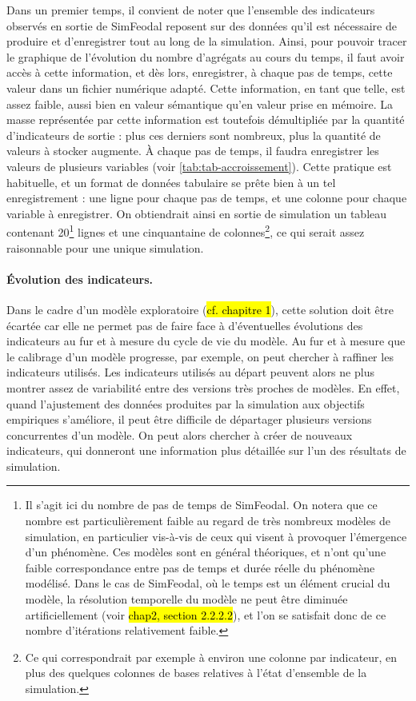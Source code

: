 Dans un premier temps, il convient de noter que l'ensemble des indicateurs observés en sortie de SimFeodal reposent sur des données qu'il est nécessaire de produire et d'enregistrer tout au long de la simulation.
Ainsi, pour pouvoir tracer le graphique de l'évolution du nombre d'agrégats au cours du temps, il faut avoir accès à cette information, et dès lors, enregistrer, à chaque pas de temps, cette valeur dans un fichier numérique adapté.
Cette information, en tant que telle, est assez faible, aussi bien en valeur sémantique qu'en valeur prise en mémoire.
La masse représentée par cette information est toutefois démultipliée par la quantité d'indicateurs de sortie : plus ces derniers sont nombreux, plus la quantité de valeurs à stocker augmente.
À chaque pas de temps, il faudra enregistrer les valeurs de plusieurs variables (voir \cref{tab:tab-accroissement}).
Cette pratique est habituelle, et un format de données tabulaire se prête bien à un tel enregistrement : une ligne pour chaque pas de temps, et une colonne pour chaque variable à enregistrer.
On obtiendrait ainsi en sortie de simulation un tableau contenant 20\footnote{
	Il s'agit ici du nombre de pas de temps de SimFeodal.
	On notera que ce nombre est particulièrement faible au regard de très nombreux modèles de simulation, en particulier vis-à-vis de ceux qui visent à provoquer l'émergence d'un phénomène.
	Ces modèles sont en général théoriques, et n'ont qu'une faible correspondance entre pas de temps et durée réelle du phénomène modélisé.
	Dans le cas de SimFeodal, où le temps est un élément crucial du modèle, la résolution temporelle du modèle ne peut être diminuée artificiellement (voir \hl{chap2, section 2.2.2.2}), et l'on se satisfait donc de ce nombre d'itérations relativement faible.
} lignes et une cinquantaine de colonnes\footnote{Ce qui correspondrait par exemple à environ une colonne par indicateur, en plus des quelques colonnes de bases relatives à l'état d'ensemble de la simulation.}, ce qui serait assez raisonnable pour une unique simulation.

\paragraph{Évolution des indicateurs.}
Dans le cadre d'un modèle exploratoire (\hl{cf. chapitre 1}), cette solution doit être écartée car elle ne permet pas de faire face à d'éventuelles évolutions des indicateurs au fur et à mesure du cycle de vie du modèle.
Au fur et à mesure que le calibrage d'un modèle progresse, par exemple, on peut chercher à raffiner les indicateurs utilisés.
Les indicateurs utilisés au départ peuvent alors ne plus montrer assez de variabilité entre des versions très proches de modèles.
En effet, quand l'ajustement des données produites par la simulation aux objectifs empiriques s'améliore, il peut être difficile de départager plusieurs versions concurrentes d'un modèle.
On peut alors chercher à créer de nouveaux indicateurs, qui donneront une information plus détaillée sur l'un des résultats de simulation.

